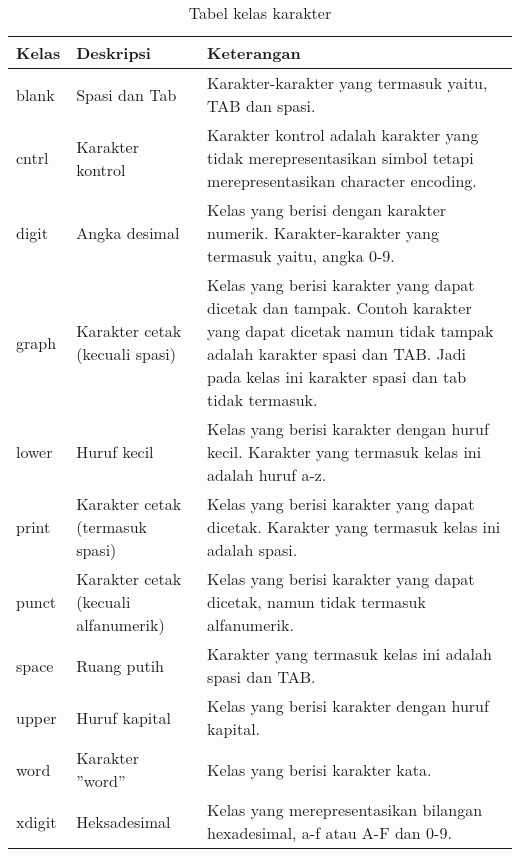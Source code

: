 \begin{table}[H]
	\renewcommand{\arraystretch}{1.5}
	\caption {Tabel kelas karakter} \label{tab:character classes2}
	\begin{center}
		\begin{tabular}{|p{2 cm}|>{\raggedright} p{5 cm}| p{7.5 cm}|}
		\hline
		Kelas & Deskripsi & Keterangan \\ 
		\hline 
		blank & Spasi dan Tab & Karakter-karakter yang termasuk yaitu, TAB dan spasi. \newline \\ 
		\hline
		cntrl & Karakter kontrol & Karakter kontrol adalah karakter yang tidak merepresentasikan simbol tetapi merepresentasikan character encoding. \newline \\ 		
		\hline 
		digit & Angka desimal & Kelas yang berisi dengan karakter numerik. Karakter-karakter yang termasuk yaitu, angka 0-9. \newline \\ 		
		\hline 
		graph & Karakter cetak (kecuali spasi) & Kelas yang berisi karakter yang dapat dicetak dan tampak. Contoh karakter yang dapat dicetak namun tidak tampak adalah karakter spasi dan TAB. Jadi pada kelas ini karakter spasi dan tab tidak termasuk. \newline \\ 
		\hline 
		lower & Huruf kecil & Kelas yang berisi karakter dengan huruf kecil. Karakter yang termasuk kelas ini adalah huruf a-z. \newline \\ 
		\hline
		print & Karakter cetak (termasuk spasi) & Kelas yang berisi karakter yang dapat dicetak. Karakter yang termasuk kelas ini adalah spasi. \newline \\ 
		\hline   
		punct & Karakter cetak (kecuali alfanumerik) & Kelas yang berisi karakter yang dapat dicetak, namun tidak termasuk alfanumerik. \newline \\ 
		\hline		
		space & Ruang putih & Karakter yang termasuk kelas ini adalah spasi dan TAB. \newline \\ 		
		\hline
		upper & Huruf kapital & Kelas yang berisi karakter dengan huruf kapital. \newline \\ 
		\hline 
		word & Karakter ''word'' & Kelas yang berisi karakter kata. \newline \\ 
		\hline 
		xdigit & Heksadesimal & Kelas yang merepresentasikan bilangan hexadesimal, a-f atau A-F dan 0-9. \newline \\ 
		\hline
		\end{tabular} 
	\end{center}
\end{table}

